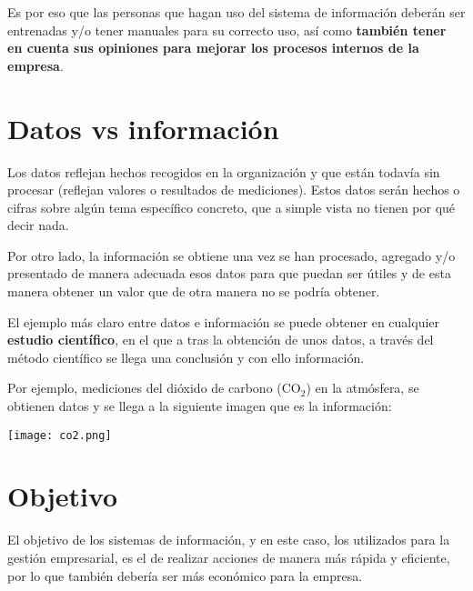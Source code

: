 
Es por eso que las personas que hagan uso del sistema de información deberán ser entrenadas y/o tener manuales para su correcto uso, así como \textbf{también tener en cuenta sus opiniones para mejorar los procesos internos de la empresa}.

\section{Datos vs información}

Los datos reflejan hechos recogidos en la organización y que están todavía sin procesar (reflejan valores o resultados de mediciones). Estos datos serán hechos o cifras sobre algún tema específico concreto, que a simple vista no tienen por qué decir nada.

Por otro lado, la información se obtiene una vez se han procesado, agregado y/o presentado de manera adecuada esos datos para que puedan ser útiles y de esta manera obtener un valor que de otra manera no se podría obtener.

El ejemplo más claro entre datos e información se puede obtener en cualquier \textbf{estudio científico}, en el que a tras la obtención de unos datos, a través del método científico se llega una conclusión y con ello información.

Por ejemplo, mediciones del dióxido de carbono (CO$_{2}$) en la atmósfera, se obtienen  datos y se llega a la siguiente imagen que es la información:

\begin{center}
    \texttt{[image: co2.png]}
\end{center}



\section{Objetivo}

El objetivo de los sistemas de información, y en este caso, los utilizados para la gestión empresarial, es el de realizar acciones de manera más rápida y eficiente, por lo que también debería ser más económico para la empresa.

